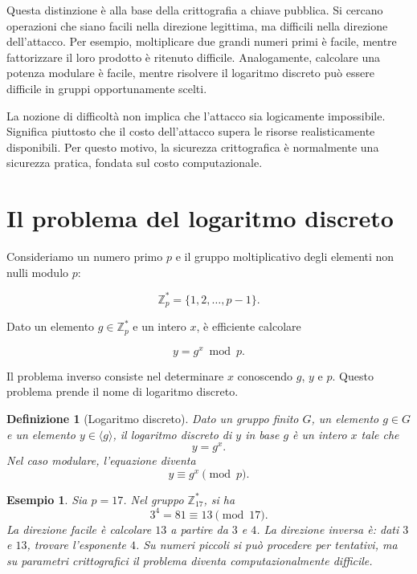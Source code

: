 \documentclass[12pt,a4paper,oneside]{report}
\newtheorem{definition}{Definizione}[chapter]
\newtheorem{example}{Esempio}[chapter]
\begin{document}
Questa distinzione è alla base della crittografia a chiave pubblica. Si cercano operazioni che siano facili nella direzione legittima, ma difficili nella direzione dell'attacco. Per esempio, moltiplicare due grandi numeri primi è facile, mentre fattorizzare il loro prodotto è ritenuto difficile. Analogamente, calcolare una potenza modulare è facile, mentre risolvere il logaritmo discreto può essere difficile in gruppi opportunamente scelti.

La nozione di difficoltà non implica che l'attacco sia logicamente impossibile. Significa piuttosto che il costo dell'attacco supera le risorse realisticamente disponibili. Per questo motivo, la sicurezza crittografica è normalmente una sicurezza pratica, fondata sul costo computazionale.

\section{Il problema del logaritmo discreto}

Consideriamo un numero primo \(p\) e il gruppo moltiplicativo degli elementi non nulli modulo \(p\):

\begin{equation}
    \mathbb{Z}_p^\ast = \{1,2,\ldots,p-1\}.
\end{equation}

Dato un elemento \(g \in \mathbb{Z}_p^\ast\) e un intero \(x\), è efficiente calcolare

\begin{equation}
    y = g^x \bmod p.
\end{equation}

Il problema inverso consiste nel determinare \(x\) conoscendo \(g\), \(y\) e \(p\). Questo problema prende il nome di logaritmo discreto.

\begin{definition}[Logaritmo discreto]
Dato un gruppo finito \(G\), un elemento \(g \in G\) e un elemento \(y \in \langle g \rangle\), il logaritmo discreto di \(y\) in base \(g\) è un intero \(x\) tale che
\[
y = g^x.
\]
Nel caso modulare, l'equazione diventa
\[
y \equiv g^x \pmod p.
\]
\end{definition}

\begin{example}
Sia \(p=17\). Nel gruppo \(\mathbb{Z}_{17}^\ast\), si ha
\[
3^4 = 81 \equiv 13 \pmod{17}.
\]
La direzione facile è calcolare \(13\) a partire da \(3\) e \(4\). La direzione inversa è: dati \(3\) e \(13\), trovare l'esponente \(4\). Su numeri piccoli si può procedere per tentativi, ma su parametri crittografici il problema diventa computazionalmente difficile.
\end{example}
\end{document}
